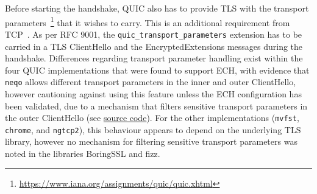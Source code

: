 Before starting the handshake, QUIC also has to provide TLS with the transport parameters~\footnote{\url{https://www.iana.org/assignments/quic/quic.xhtml}} that it wishes to carry. This is an additional requirement from TCP~\cite{rfc9000}. As per RFC 9001, the \texttt{quic\_transport\_parameters} extension has to be carried in a TLS ClientHello and the EncryptedExtensions messages during the handshake.
Differences regarding transport parameter handling exist within the four QUIC implementations that were found to support ECH, with evidence that \texttt{neqo} allows different transport parameters in the inner and outer ClientHello, however cautioning against using this feature unless the ECH configuration has been validated, due to a mechanism that filters sensitive transport parameters in the outer ClientHello (see \href{https://github.com/mozilla/neqo/blob/main/neqo-crypto/src/agent.rs#L1176-L1182}{source code}).
For the other implementations (\texttt{mvfst}, \texttt{chrome}, and \texttt{ngtcp2}), this behaviour appears to depend on the underlying TLS library, however no mechanism for filtering sensitive transport parameters was noted in the libraries BoringSSL and fizz.

